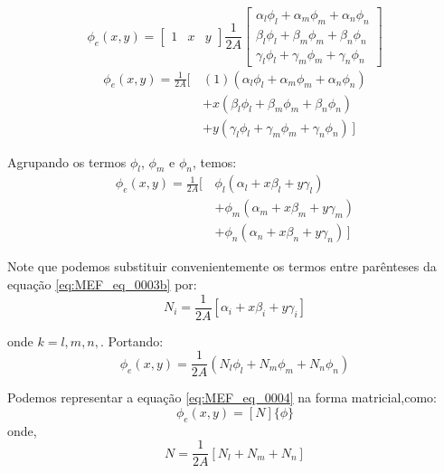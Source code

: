 \documentclass[
12pt,
a4paper,
oneside,
chapter=TITLE,
sumario=tradicional
]{abntex2}
\begin{document}
    \begin{equation*}
   	\phi_e(x,y) =
   	\begin{bmatrix}
   		1 & x & y
   	\end{bmatrix}    	
   	\frac{1}{2A}
   	\begin{bmatrix}
   		\alpha_l\phi_{l} +\alpha_m\phi_{m} + \alpha_n\phi_{n} \\
   		\beta_l\phi_{l} + \beta_m\phi_{m} + \beta_n\phi_{n} \\
   		\gamma_l\phi_{l} + \gamma_m\phi_{m} + \gamma_n\phi_{n}
   	\end{bmatrix}
    \end{equation*}
    \begin{equation*}
    \begin{aligned}
   	\phi_e(x,y) =  \frac{1}{2A} \Big[ \,
   	    &(1)(\alpha_l\phi_{l} +\alpha_m\phi_{m} + \alpha_n\phi_{n}) \\
   		& + x(\beta_l\phi_{l} + \beta_m\phi_{m} + \beta_n\phi_{n}) \\
   		& + y(\gamma_l\phi_{l} + \gamma_m\phi_{m} + \gamma_n\phi_{n})\,\Big]
   	\end{aligned}
    \end{equation*}
    
	Agrupando os termos $\phi_l$, $\phi_m$ e $\phi_n$, temos:
	\begin{equation}
	\begin{aligned}
		\phi_e(x,y) = \frac{1}{2A} \Big[ \,
		&\phi_l \left(\alpha_l + x\beta_l + y\gamma_l\right) \\
		&+ \phi_m \left(\alpha_m + x\beta_m + y\gamma_m\right) \\
		&+ \phi_n \left(\alpha_n + x\beta_n + y\gamma_n\right)
		\,\Big]
	\end{aligned}
	\label{eq:MEF_eq_0003b}
	\end{equation}

    Note que podemos substituir convenientemente os termos entre parênteses da equação \ref{eq:MEF_eq_0003b} por:
    \begin{equation*}
    	N_i = \frac{1}{2A}[\alpha_i + x\beta_i + y\gamma_i]
    \end{equation*}
    
    onde $k=l,m,n,$. Portando:
    \begin{equation}
    	\phi_e(x,y) = \frac{1}{2A}(N_l\phi_l + N_m \phi_m  + N_n\phi_n) \label{eq:MEF_eq_0004}
    \end{equation}
    
    Podemos representar a equação \ref{eq:MEF_eq_0004} na forma matricial,como:
    \begin{equation}
    	\phi_e(x,y) = [N] \{ \phi \} \label{eq:MEF_eq_0005}
    \end{equation}
    onde,
     \begin{equation*}
    	N = \frac{1}{2A}[N_l + N_m  + N_n]
    \end{equation*}
    
\end{document}
